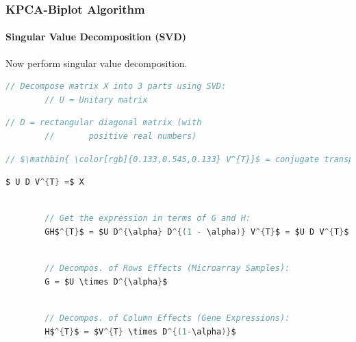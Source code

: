 \documentclass[serif]{beamer}
\newcommand{\codepause}{\pause \vspace{-0.165in} }
\begin{document}
	\begin{frame}[fragile,t]
		\frametitle{KPCA-Biplot Algorithm}
		\framesubtitle{Singular Value Decomposition \textbf{(SVD)}}
		Now perform singular value decomposition. \newline
		
		
		\begin{lstlisting}[mathescape, language=C]
		// Decompose matrix X into 3 parts using SVD:
		// U = Unitary matrix
		\end{lstlisting}
		\codepause
		\begin{lstlisting}[mathescape, language=C]
		// D = rectangular diagonal matrix (with
		//       positive real numbers)
		\end{lstlisting}
		\codepause 
		\begin{lstlisting}[mathescape, language=C]
		// $\mathbin{ \color[rgb]{0.133,0.545,0.133} V^{T}}$ = conjugate transpose of V (a unitary matrix)
		\end{lstlisting}
		\codepause
		\begin{lstlisting}[mathescape, language=C]
		$ U D V^{T} =$ X
		\end{lstlisting}
		\codepause
		\begin{lstlisting}[mathescape, language=C]
		
		// Get the expression in terms of G and H:
		GH$^{T}$ = $U D^{\alpha} D^{(1 - \alpha)} V^{T}$ = $U D V^{T}$ = X 
		\end{lstlisting}
		\codepause
		\begin{lstlisting}[mathescape, language=C]
		
		// Decompos. of Rows Effects (Microarray Samples):
		G = $U \times D^{\alpha}$ 	
		\end{lstlisting}
		\codepause
		\begin{lstlisting}[mathescape, language=C]
		
		// Decompos. of Column Effects (Gene Expressions):
		H$^{T}$ = $V^{T} \times D^{(1-\alpha)}$	
		\end{lstlisting}
	\end{frame}
\end{document}
